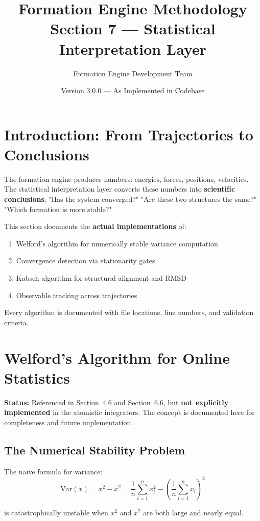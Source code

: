 \documentclass[11pt]{article}
\title{\textbf{Formation Engine Methodology} \\
\Large Section 7 — Statistical Interpretation Layer}
\author{Formation Engine Development Team}
\date{Version 3.0.0 — As Implemented in Codebase}
\begin{document}
\maketitle

\section{Introduction: From Trajectories to Conclusions}

The formation engine produces numbers: energies, forces, positions, velocities. The statistical interpretation layer converts these numbers into \textbf{scientific conclusions}: "Has the system converged?" "Are these two structures the same?" "Which formation is more stable?"

This section documents the \textbf{actual implementations} of:
\begin{enumerate}
\item Welford's algorithm for numerically stable variance computation
\item Convergence detection via stationarity gates
\item Kabsch algorithm for structural alignment and RMSD
\item Observable tracking across trajectories
\end{enumerate}

Every algorithm is documented with file locations, line numbers, and validation criteria.

\section{Welford's Algorithm for Online Statistics}

\textbf{Status:} Referenced in Section~4.6 and Section~6.6, but \textbf{not explicitly implemented} in the atomistic integrators. The concept is documented here for completeness and future implementation.

\subsection{The Numerical Stability Problem}

The naive formula for variance:
\begin{equation}
\text{Var}(x) = \overline{x^2} - \bar{x}^2 = \frac{1}{n}\sum_{i=1}^{n} x_i^2 - \left(\frac{1}{n}\sum_{i=1}^{n} x_i\right)^2
\end{equation}

is catastrophically unstable when $\overline{x^2}$ and $\bar{x}^2$ are both large and nearly equal.
\end{document}
